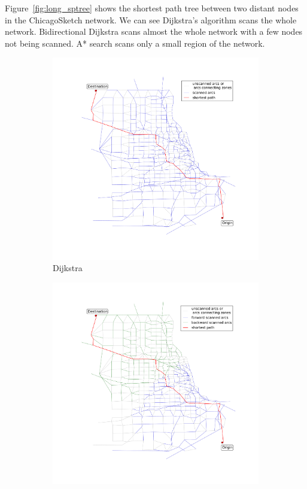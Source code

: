 Figure~\ref{fig:long_sptree} shows the shortest path tree between two distant nodes in the ChicagoSketch network.
We can see Dijkstra's algorithm scans the whole network.
Bidirectional Dijkstra scans almost the whole network with a few nodes not being scanned.
A* search scans only a small region of the network.
\begin{figure}
    \centering
    \begin{subfigure}{.5\textwidth}
        \centering
        \includegraphics[width=\textwidth,trim=120px 120px 48px 120px,clip]{img/chicago_dijkstra}
        \caption{Dijkstra}
        \label{fig:chicago_dijkstra}
    \end{subfigure}%
    \begin{subfigure}{.5\textwidth}
        \centering
        \includegraphics[width=\textwidth,trim=120px 120px 48px 120px,clip]{img/chicago_bidirect}

\end{subfigure}
\end{figure}
